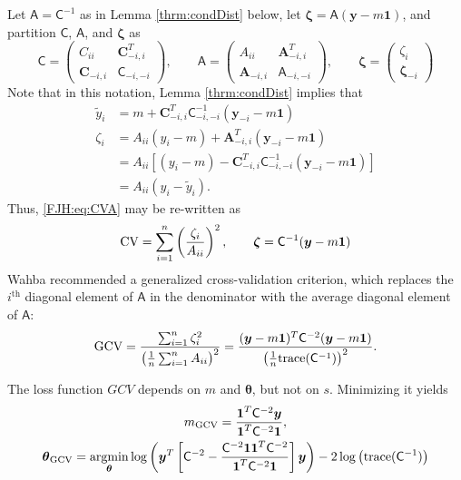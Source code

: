 \documentclass[twocolumn]{svjour3}          %
\newcommand{\bm}[1]{\boldsymbol{#1}}
\newcommand{\trace}[1]{\textup{trace}{#1}}
\newcommand{\vtheta}{{\bm{\theta}}}
\newcommand{\vzeta}{{\bm{\zeta}}}
\newcommand{\vA}{\bm{A}}
\newcommand{\vC}{\bm{C}}
\newcommand{\vy}{\bm{y}}
\newcommand{\vone}{\bm{1}}
\newcommand{\mA}{\mathsf{A}}
\newcommand{\mC}{\mathsf{C}}
\providecommand{\argmin}{\operatorname*{argmin}}
\begin{document}
Let $\mA = \mC^{-1}$ as in Lemma \ref{thrm:condDist} below, let $\vzeta = \mA (\vy - m \vone)$, and partition $\mC$, $\mA$, and $\vzeta$ as
\begin{equation*}
\mC = \begin{pmatrix} C_{ii}  & \vC_{-i,i}^T \\  \vC_{-i,i} & \mC_{-i,-i}\end{pmatrix}, \qquad
\mA = \begin{pmatrix} A_{ii}  & \vA_{-i,i}^T \\  \vA_{-i,i} & \mA_{-i,-i}\end{pmatrix}, \qquad \vzeta = \begin{pmatrix} \zeta_i   \\  \vzeta_{-i} \end{pmatrix}
\end{equation*}
Note that in this notation, Lemma \ref{thrm:condDist} implies that 
\begin{align*}
\widetilde{y}_i & = m + \vC^T_{-i,i} \mC_{-i,-i}^{-1} (\vy_{-i} -m \vone)  \\
\zeta_i  & = A_{ii}(y_i - m) + \vA_{-i,i}^T(\vy_{-i} - m \vone) \\
& = A_{ii}[(y_i - m) - \vC^T_{-i,i} \mC_{-i,-i}^{-1} (\vy_{-i} -m \vone)] \\
& = A_{ii}(y_i - \widetilde{y}_i).
\end{align*}
Thus, \eqref{FJH:eq:CVA} may be re-written as 
\begin{equation} \label{FJH:eq:CVA}
\textup{CV} = \sum_{i=1}^n \left(\frac{\zeta_i}{A_{ii}} \right)^2, \qquad \vzeta = \mC^{-1}(\vy - m \vone)
\end{equation}
Wahba recommended a generalized cross-validation criterion, which replaces the $i^{\text{th}}$ diagonal element of $\mA$ in the denominator with the average diagonal element of $\mA$:
\begin{equation} \label{FJH:eq:CVA}
\textup{GCV} 
= \frac{\sum_{i=1}^n\zeta_i^2}{\left(\frac 1n \sum_{i=1}^n A_{ii} \right)^2} 
= \frac{(\vy - m\vone)^T \mC^{-2} (\vy - m \vone)}{\left(\frac 1n \trace(\mC^{-1}) \right)^2}.
\end{equation}

The loss function $GCV$ depends on $m$ and $\vtheta$, but not on $s$.  Minimizing it yields
\begin{gather}
m_{\textup{GCV}} = \frac{\vone^T \mC^{-2} \vy}{\vone^T \mC^{-2} \vone},\\ 
\vtheta_{\textup{GCV}} = \argmin_\vtheta \log \left (  \vy^T \left[\mC^{-2} - \frac{\mC^{-2} \vone \vone^T \mC^{-2}}{\vone^T \mC^{-2} \vone}  \right] \vy \right ) - 2 \log \left ( \trace(\mC^{-1}) \right )
\end{gather}
\end{document}
